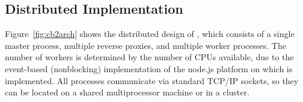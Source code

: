 %    
%    
%

\apphierarchyfig{}
%
%
\newarchitectureoverview{}
%
\subsection{Distributed Implementation}
\label{sec:distribution}
Figure~\ref{fig:cb2arch} shows the distributed design of \cbtwo, which consists of a single
master process, multiple reverse proxies, and multiple worker processes.  The number of workers 
is determined by the number of CPUs available, due to the event-based (nonblocking) implementation
of the node.js platform on which \cb is implemented.  All processes communicate via standard 
TCP/IP sockets, so they can be located on a shared multiprocessor machine or in a cluster.


